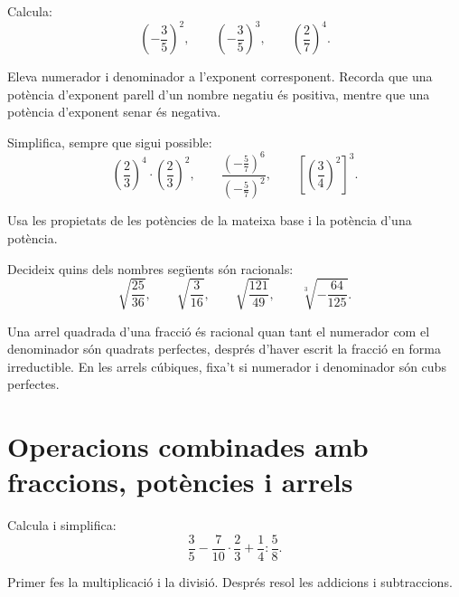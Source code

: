\begin{exercici}[Potències]
	Calcula:
	\[
	\left(-\frac{3}{5}\right)^2,
	\qquad
	\left(-\frac{3}{5}\right)^3,
	\qquad
	\left(\frac{2}{7}\right)^4.
	\]
\end{exercici}

\begin{indicacio}
	Eleva numerador i denominador a l'exponent corresponent. Recorda que una potència d'exponent parell d'un nombre negatiu és positiva, mentre que una potència d'exponent senar és negativa.
\end{indicacio}

\begin{exercici}
	Simplifica, sempre que sigui possible:
	\[
	\left(\frac{2}{3}\right)^4\cdot\left(\frac{2}{3}\right)^2,
	\qquad
	\frac{\left(-\frac{5}{7}\right)^6}{\left(-\frac{5}{7}\right)^2},
	\qquad
	\left[\left(\frac{3}{4}\right)^2\right]^3.
	\]
\end{exercici}

\begin{indicacio}
	Usa les propietats de les potències de la mateixa base i la potència d'una potència.
\end{indicacio}

\begin{exercici}[Arrels]
	Decideix quins dels nombres següents són racionals:
	\[
	\sqrt{\frac{25}{36}},
	\qquad
	\sqrt{\frac{3}{16}},
	\qquad
	\sqrt{\frac{121}{49}},
	\qquad
	\sqrt[3]{-\frac{64}{125}}.
	\]
\end{exercici}

\begin{indicacio}
	Una arrel quadrada d'una fracció és racional quan tant el numerador com el denominador són quadrats perfectes, després d'haver escrit la fracció en forma irreductible. En les arrels cúbiques, fixa't si numerador i denominador són cubs perfectes.
\end{indicacio}

\section{Operacions combinades amb fraccions, potències i arrels}

\begin{exercici}
	Calcula i simplifica:
	\[
	\frac{3}{5}
	-
	\frac{7}{10}\cdot\frac{2}{3}
	+
	\frac{1}{4}:\frac{5}{8}.
	\]
\end{exercici}

\begin{indicacio}
	Primer fes la multiplicació i la divisió. Després resol les addicions i subtraccions.
\end{indicacio}

